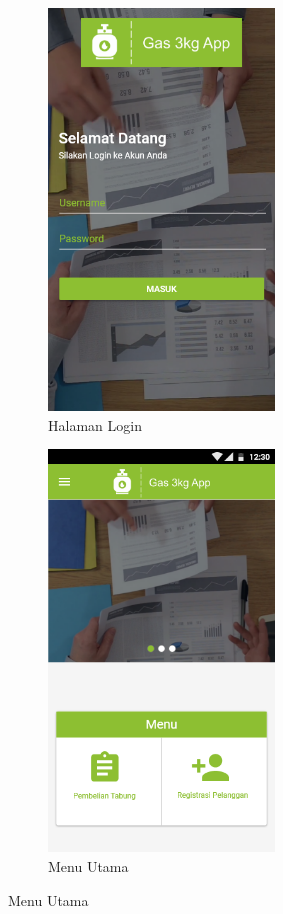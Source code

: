 \begin{enumerate}[1.]
	
	\begin{figure}[H]
		\center
		\begin{subfigure}[t]{6cm}
			\center
		\includegraphics [width = 6cm]{gambar/and/login}
		\caption{Halaman Login}\label{login}		
		\end{subfigure}\hspace{0.3cm}
		\begin{subfigure}[t]{6cm}
			\center
			\includegraphics [width = 6cm]{gambar/and/beranda}
			\caption{Menu Utama}\label{beranda}		
		\end{subfigure}\vspace{0.3cm}

\end{figure}
\end{enumerate}
